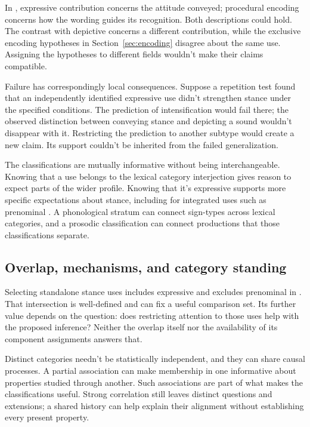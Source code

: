 \documentclass[12pt]{article}
\begin{document}
In , expressive contribution concerns
the attitude conveyed; procedural encoding concerns how the wording
guides its recognition. Both descriptions could hold. The contrast with
depictive  concerns a different contribution, while the
exclusive encoding hypotheses in Section~\ref{sec:encoding} disagree about
the same use. Assigning the hypotheses to different fields wouldn't
make their claims compatible.

Failure has correspondingly local consequences. Suppose a repetition
test found that an independently identified expressive use didn't
strengthen stance under the specified conditions. The prediction of
intensification would fail there; the observed distinction between
conveying stance and depicting a sound wouldn't disappear with it.
Restricting the prediction to another subtype would create a new
claim. Its support couldn't be inherited from the failed generalization.

The classifications are mutually informative without being interchangeable.
Knowing that a use belongs to the lexical category interjection gives
reason to expect parts of the wider profile. Knowing that it's expressive
supports more specific expectations about stance, including for integrated
uses such as prenominal . A phonological stratum can connect
sign-types across lexical categories, and a prosodic classification can
connect productions that those classifications separate.

\subsection{Overlap, mechanisms, and category standing}

Selecting standalone stance uses includes expressive 
and excludes prenominal  in . That
intersection is well-defined and can fix a useful comparison set.
Its further value depends on the question: does restricting attention
to those uses help with the proposed inference? Neither the overlap
itself nor the availability of its component assignments answers that.

Distinct categories needn't be statistically independent, and they can
share causal processes. A partial association can make membership in
one informative about properties studied through another. Such associations
are part of what makes the classifications useful. Strong correlation
still leaves distinct questions and extensions; a shared history can
help explain their alignment without establishing every present property.
\end{document}
